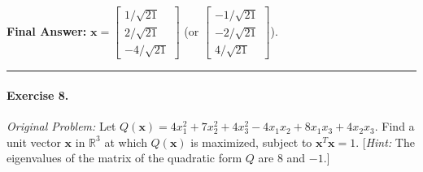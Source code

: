 \documentclass[11pt, letterpaper]{article}
\theoremstyle{definition}
\theoremstyle{remark}
\begin{document}
\textbf{Final Answer:} $\mathbf{x} = \begin{bmatrix} 1/\sqrt{21} \\ 2/\sqrt{21} \\ -4/\sqrt{21} \end{bmatrix}$ (or $\begin{bmatrix} -1/\sqrt{21} \\ -2/\sqrt{21} \\ 4/\sqrt{21} \end{bmatrix}$).

\medskip
\hrule
\medskip

\paragraph{Exercise 8.}
\emph{Original Problem:} Let $Q(\mathbf{x}) = 4x_1^2 + 7x_2^2 + 4x_3^2 - 4x_1 x_2 + 8x_1 x_3 + 4x_2 x_3$. Find a unit vector $\mathbf{x}$ in $\mathbb{R}^3$ at which $Q(\mathbf{x})$ is maximized, subject to $\mathbf{x}^T \mathbf{x} = 1$. [\emph{Hint:} The eigenvalues of the matrix of the quadratic form $Q$ are $8$ and $-1$.]
\end{document}
